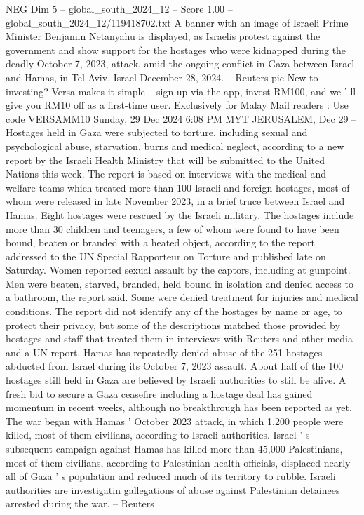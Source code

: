 \begin{textsample}{NEG Dim 5 – global\_south\_2024\_12 – Score 1.00 – global\_south\_2024\_12/119418702.txt}  \label{ex:f5_neg_404}
A banner with an image of Israeli Prime Minister Benjamin Netanyahu is displayed, as Israelis protest against the government and show support for the hostages who were kidnapped during the deadly October 7, 2023, attack, amid the ongoing conflict in Gaza between Israel and Hamas, in Tel Aviv, Israel December 28, 2024. -- Reuters pic New to investing?
Versa makes it simple -- sign up via the app, invest RM100, and we ' ll give you RM10 off as a first-time user.
Exclusively for Malay Mail readers : Use code VERSAMM10 Sunday, 29 Dec 2024 6:08 PM MYT JERUSALEM, Dec 29 -- Hostages held in Gaza were subjected to torture, including sexual and psychological abuse, starvation, burns and medical neglect, according to a new report by the Israeli Health Ministry that will be submitted to the United Nations this week.
The report is based on interviews with the medical and welfare teams which treated more than 100 Israeli and foreign hostages, most of whom were released in late November 2023, in a brief truce between Israel and Hamas.
Eight hostages were rescued by the Israeli military.
The hostages include more than 30 children and teenagers, a few of whom were found to have been bound, beaten or branded with a heated object, according to the report addressed to the UN Special Rapporteur on Torture and published late on Saturday.
Women reported sexual assault by the captors, including at gunpoint.
Men were beaten, starved, branded, held bound in isolation and denied access to a bathroom, the report said.
Some were denied treatment for injuries and medical conditions.
The report did not identify any of the hostages by name or age, to protect their privacy, but some of the descriptions matched those provided by hostages and staff that treated them in interviews with Reuters and other media and a UN report.
Hamas has repeatedly denied abuse of the 251 hostages abducted from Israel during its October 7, 2023 assault.
About half of the 100 hostages still held in Gaza are believed by Israeli authorities to still be alive.
A fresh bid to secure a Gaza ceasefire including a hostage deal has gained momentum in recent weeks, although no breakthrough has been reported as yet.
The war began with Hamas ' October 2023 attack, in which 1,200 people were killed, most of them civilians, according to Israeli authorities.
Israel ' s subsequent campaign against Hamas has killed more than 45,000 Palestinians, most of them civilians, according to Palestinian health officials, displaced nearly all of Gaza ' s population and reduced much of its territory to rubble.
Israeli authorities are investigatin gallegations of abuse against Palestinian detainees arrested during the war. -- Reuters

\end{textsample}
